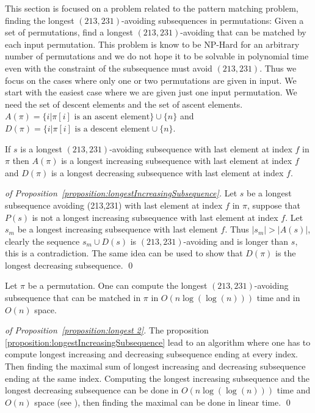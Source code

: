 \documentclass[a4paper]{llncs}
\newcounter{num}
\begin{document}
This section is focused on a problem related to the pattern matching problem, finding the longest $(213,231)$-avoiding subsequences in permutations:
Given a set of permutations, find a longest $(213,231)$-avoiding that can be matched
by each input permutation.
This problem is know to be NP-Hard for an arbitrary number of permutations and we do not hope it to be solvable in polynomial time even with the constraint of the subsequence must avoid $(213,231)$. Thus we focus on the cases where only one or two permutations are given in input.
We start with the easiest case where we are given just one input permutation.
We need the set of descent elements and the set of ascent elements.
$A(\pi) = \{i | \text{$\pi[i]$ is an ascent element} \} \cup \{n\}$ and
$D(\pi) = \{i | \text{$\pi[i]$ is a descent element} \cup \{n\}$.\\

\begin{proposition}
\label{proposition:longestIncreasingSubsequence}
If $s$ is a longest $(213,231)$-avoiding subsequence with last element at index 
$f$ in $\pi$ then
$A(\pi)$ is a longest increasing subsequence with last element at index $f$ and
$D(\pi)$ is a longest decreasing subsequence with last element at index $f$.
\end{proposition}

\begin{proof}[of Proposition~\ref{proposition:longestIncreasingSubsequence}]
Let $s$ be a longest subsequence avoiding (213,231) with last element at index $f$ in $\pi$,
suppose that $P(s)$ is not a longest increasing subsequence with last element at index $f$. Let $s_m$ be a longest increasing subsequence with last element $f$.
Thus $|s_m|>|A(s)|$, clearly the sequence $s_m \cup D(s)$
is $(213,231)$-avoiding and is longer than $s$, this is a contradiction.
The same idea can be used to show that $D(\pi)$ is the longest decreasing subsequence.
\qed
\end{proof}

\begin{proposition}
\label{proposition:longest 2}
Let $\pi$ be a permutation. One can compute
the longest $(213,231)$-avoiding subsequence that can be matched in $\pi$
in $O(n\log(\log(n)))$ time and in $O(n)$ space.
\end{proposition}

\begin{proof}[of Proposition~\ref{proposition:longest 2}]
The proposition \ref{proposition:longestIncreasingSubsequence} lead to an algorithm
where one has to compute longest increasing and decreasing subsequence ending at every index. Then finding the maximal sum of longest increasing and decreasing subsequence ending at the same index.
Computing the longest increasing subsequence and the longest decreasing subsequence can be done in 
$O(n\log(\log(n)))$ time and $O(n)$ space 
(see \cite{Bespamyatnikh00enumeratinglongest}), 
then finding the maximal can be done in linear time.
\qed
\end{proof}
\end{document}
